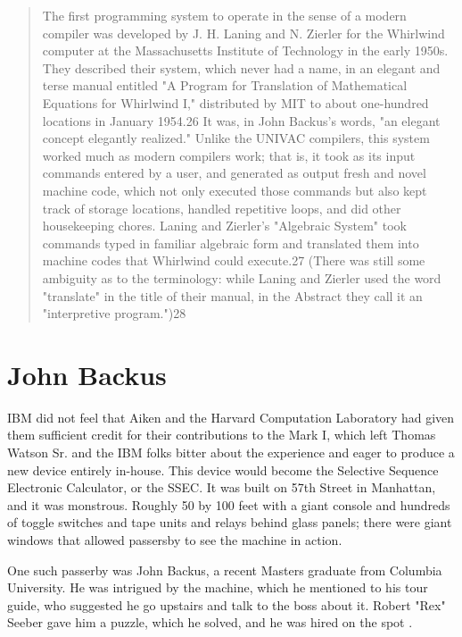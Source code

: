 \begin{quotation}
  The first programming system to operate in the sense of a modern compiler was
  developed by J. H. Laning and N. Zierler for the Whirlwind computer at the
  Massachusetts Institute of Technology in the early 1950s. They described their
  system, which never had a name, in an elegant and terse manual entitled "A
  Program for Translation of Mathematical Equations for Whirlwind I,"
  distributed
  by MIT to about one-hundred locations in January 1954.26 It was, in John
  Backus's words, "an elegant concept elegantly realized." Unlike the UNIVAC
  compilers, this system worked much as modern compilers work; that is, it took
  as its input commands entered by a user, and generated as output fresh and
  novel machine code, which not only executed those commands but also kept track
  of storage locations, handled repetitive loops, and did other housekeeping
  chores. Laning and Zierler's "Algebraic System" took commands typed
  in familiar
  algebraic form and translated them into machine codes that Whirlwind could
  execute.27 (There was still some ambiguity as to the terminology: while Laning
    and Zierler used the word "translate" in the title of their manual, in the
  Abstract they call it an "interpretive program.")28
  \cite{new-history-of-modern-computing}
\end{quotation}

\section{John Backus}

IBM did not feel that Aiken and the Harvard Computation Laboratory had given
them sufficient credit for their contributions to the Mark I, which left
Thomas Watson Sr. and the IBM folks bitter about the experience and eager to
produce a new device entirely in-house. This device would become the Selective
Sequence Electronic Calculator, or the SSEC. It was built on 57th Street in
Manhattan, and it was monstrous. Roughly 50 by 100 feet with a giant console
and hundreds of toggle switches and tape units and relays behind glass panels;
there were giant windows that allowed passersby to see the machine in action.

One such passerby was John Backus, a recent Masters graduate from Columbia
University. He was intrigued by the machine, which he mentioned to his tour
guide, who suggested he go upstairs and talk to the boss about it. Robert "Rex"
Seeber gave him a puzzle, which he solved, and he was hired on the spot
\cite{backus_oral_history_2006}.

